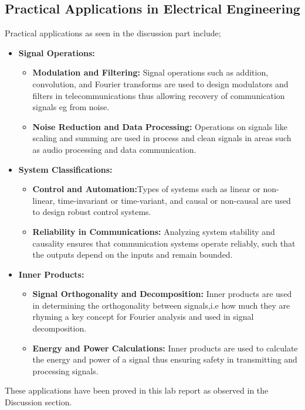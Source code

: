 \documentclass[10pt, twocolumn]{article}
\begin{document}
\subsection{Practical Applications in Electrical Engineering}
Practical applications as seen in the discussion part include;
\begin{itemize}
    \item \textbf{Signal Operations:}
    \begin{itemize}
        \item \textbf{Modulation and Filtering:} Signal operations such as addition, convolution, and Fourier transforms are used to design modulators and filters in telecommunications thus allowing recovery of communication signals eg from noise.
        \item \textbf{Noise Reduction and Data Processing:} Operations on signals like scaling and  summing are used in process and clean signals in areas such as audio processing and data communication.
    \end{itemize}
    
    \item \textbf{System Classifications:}
    \begin{itemize}
        \item \textbf{Control and Automation:}Types of systems such as linear or non-linear, time-invariant or time-variant, and causal or non-causal are used to design robust control systems.
        \item \textbf{Reliability in Communications:} Analyzing system stability and causality ensures that communication systems operate reliably, such that the outputs depend on the inputs and remain bounded.
    \end{itemize}
    
    \item \textbf{Inner Products:}
    \begin{itemize}
        \item \textbf{Signal Orthogonality and Decomposition:} Inner products are used in determining the orthogonality between signals,i.e how much they are rhyming a key concept for Fourier analysis and used in signal decomposition.
        \item \textbf{Energy and Power Calculations:} Inner products are used to calculate the energy and power of a signal thus ensuring safety in transmitting and processing signals.
    \end{itemize}
\end{itemize}
These applications have been proved in this lab report as observed in the Discussion section.
\end{document}
